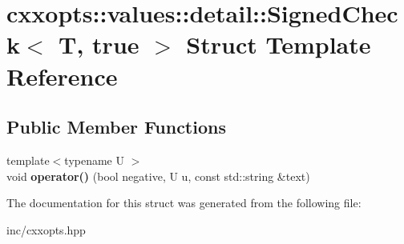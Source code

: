 \hypertarget{structcxxopts_1_1values_1_1detail_1_1SignedCheck_3_01T_00_01true_01_4}{}\section{cxxopts\+:\+:values\+:\+:detail\+:\+:Signed\+Check$<$ T, true $>$ Struct Template Reference}
\label{structcxxopts_1_1values_1_1detail_1_1SignedCheck_3_01T_00_01true_01_4}
\subsection*{Public Member Functions}
\begin{DoxyCompactItemize}
\item 
{\footnotesize template$<$typename U $>$ }\\void {\bfseries operator()} (bool negative, U u, const std\+::string \&text)\hypertarget{structcxxopts_1_1values_1_1detail_1_1SignedCheck_3_01T_00_01true_01_4_a03b02f6c1e500d96c8b8b13cbe858ce4}{}\label{structcxxopts_1_1values_1_1detail_1_1SignedCheck_3_01T_00_01true_01_4_a03b02f6c1e500d96c8b8b13cbe858ce4}

\end{DoxyCompactItemize}


The documentation for this struct was generated from the following file\+:\begin{DoxyCompactItemize}
\item 
inc/cxxopts.\+hpp\end{DoxyCompactItemize}
